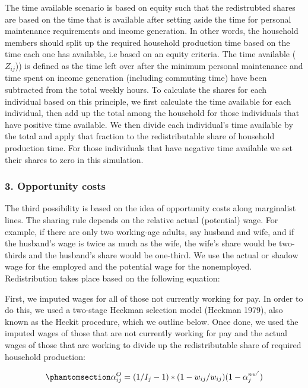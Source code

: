 \documentclass[
  11pt,
]{article}
\begin{document}
The time available scenario is based on equity such that the
redistrubted shares are based on the time that is available after
setting aside the time for personal maintenance requirements and income
generation. In other words, the household members should split up the
required household production time based on the time each one has
available, i.e based on an equity criteria. The time available
(\(Z_{ij}\))) is defined as the time left over after the minimum
personal maintenance and time spent on income generation (including
commuting time) have been subtracted from the total weekly hours. To
calculate the shares for each individual based on this principle, we
first calculate the time available for each individual, then add up the
total among the household for those individuals that have positive time
available. We then divide each individual's time available by the total
and apply that fraction to the redistributable share of household
production time. For those individuals that have negative time available
we set their shares to zero in this simulation.

\subsubsection{3. Opportunity costs}\label{opportunity-costs}

The third possibility is based on the idea of opportunity costs along
marginalist lines. The sharing rule depends on the relative actual
(potential) wage. For example, if there are only two working-age adults,
say husband and wife, and if the husband's wage is twice as much as the
wife, the wife's share would be two-thirds and the husband's share would
be one-third. We use the actual or shadow wage for the employed and the
potential wage for the nonemployed. Redistribution takes place based on
the following equation:

First, we imputed wages for all of those not currently working for pay.
In order to do this, we used a two-stage Heckman selection model
(Heckman 1979), also known as the Heckit procedure, which we outline
below. Once done, we used the imputed wages of those that are not
currently working for pay and the actual wages of those that are working
to divide up the redistributable share of required household production:

\begin{equation}\phantomsection\label{eq-r3}{\alpha_{ij}^O= (1/{I_j-1})*(1-w_{ij}/w_{ij} ) (1-\alpha_{j}^{nw'})
}\end{equation}
\end{document}
